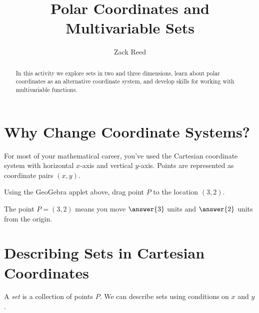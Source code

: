 \documentclass{ximera}
\title{Polar Coordinates and Multivariable Sets}
\author{Zack Reed}
\begin{document}
\begin{abstract}
In this activity we explore sets in two and three dimensions, learn about polar coordinates as an alternative coordinate system, and develop skills for working with multivariable functions.
\end{abstract}
\maketitle

\section*{Why Change Coordinate Systems?}

For most of your mathematical career, you've used the Cartesian coordinate system with horizontal $x$-axis and vertical $y$-axis. Points are represented as coordinate pairs $(x,y)$.

\begin{center}
\end{center}

\begin{problem}
    Using the GeoGebra applet above, drag point $P$ to the location $(3,2)$.
    
    The point $P=(3,2)$ means you move $\answer{3}$ units  and $\answer{2}$ units  from the origin.
\end{problem}

\section*{Describing Sets in Cartesian Coordinates}

A \emph{set} is a collection of points $P$. We can describe sets using conditions on $x$ and $y$.

\begin{center}
\end{center}
\end{document}
